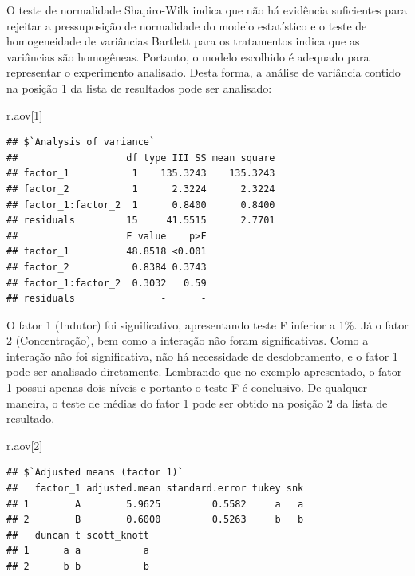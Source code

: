 \documentclass[
]{article}
\newenvironment{Shaded}{\begin{snugshade}}{\end{snugshade}}
\newcommand{\DecValTok}[1]{\textcolor[rgb]{0.00,0.00,0.81}{#1}}
\newcommand{\NormalTok}[1]{#1}
\begin{document}
O teste de normalidade Shapiro-Wilk indica que não há evidência suficientes para rejeitar a pressuposição de normalidade do modelo estatístico e o teste de homogeneidade de variâncias Bartlett para os tratamentos indica que as variâncias são homogêneas. Portanto, o modelo escolhido é adequado para representar o experimento analisado. Desta forma, a análise de variância contido na posição 1 da lista de resultados pode ser analisado:

\begin{Shaded}
\begin{Highlighting}[]
\NormalTok{r.aov[}\DecValTok{1}\NormalTok{]}
\end{Highlighting}
\end{Shaded}

\begin{verbatim}
## $`Analysis of variance`
##                   df type III SS mean square
## factor_1           1    135.3243    135.3243
## factor_2           1      2.3224      2.3224
## factor_1:factor_2  1      0.8400      0.8400
## residuals         15     41.5515      2.7701
##                   F value    p>F
## factor_1          48.8518 <0.001
## factor_2           0.8384 0.3743
## factor_1:factor_2  0.3032   0.59
## residuals               -      -
\end{verbatim}

O fator 1 (Indutor) foi significativo, apresentando teste F inferior a 1\%. Já o fator 2 (Concentração), bem como a interação não foram significativas. Como a interação não foi significativa, não há necessidade de desdobramento, e o fator 1 pode ser analisado diretamente. Lembrando que no exemplo apresentado, o fator 1 possui apenas dois níveis e portanto o teste F é conclusivo. De qualquer maneira, o teste de médias do fator 1 pode ser obtido na posição 2 da lista de resultado.

\begin{Shaded}
\begin{Highlighting}[]
\NormalTok{r.aov[}\DecValTok{2}\NormalTok{]}
\end{Highlighting}
\end{Shaded}

\begin{verbatim}
## $`Adjusted means (factor 1)`
##   factor_1 adjusted.mean standard.error tukey snk
## 1        A        5.9625         0.5582     a   a
## 2        B        0.6000         0.5263     b   b
##   duncan t scott_knott
## 1      a a           a
## 2      b b           b
\end{verbatim}
\end{document}
